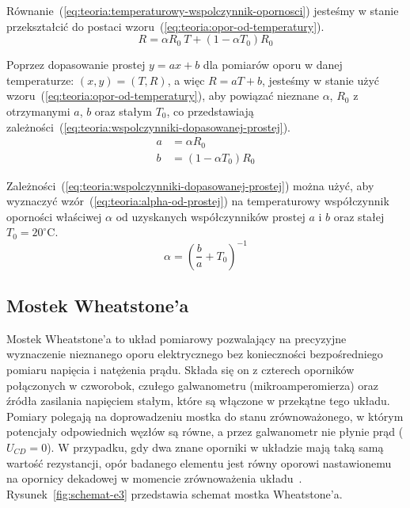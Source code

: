 \documentclass[twocolumn, a4paper, polish, 10pt]{article}
\begin{document}
Równanie~(\ref{eq:teoria:temperaturowy-wspolczynnik-opornosci}) jesteśmy w stanie przekształcić do postaci wzoru~(\ref{eq:teoria:opor-od-temperatury}).
\begin{equation}
    R = \alpha R_0~T + \left(1 - \alpha T_0 \right) R_0
    \label{eq:teoria:opor-od-temperatury}
\end{equation}

Poprzez dopasowanie prostej $y=ax+b$ dla pomiarów oporu w danej temperaturze: ${(x, y) = (T, R)}$, a więc $R = aT + b$, jesteśmy w stanie użyć wzoru~(\ref{eq:teoria:opor-od-temperatury}), aby powiązać nieznane $\alpha$, $R_0$ z otrzymanymi $a$, $b$ oraz stałym $T_0$, co przedstawiają zależności~(\ref{eq:teoria:wspolczynniki-dopasowanej-prostej}).
\begin{equation}
\begin{split}
    a &= \alpha R_0 \\
    b &= \left(1 - \alpha T_0 \right) R_0
    \label{eq:teoria:wspolczynniki-dopasowanej-prostej}
\end{split}
\end{equation}

Zależności~(\ref{eq:teoria:wspolczynniki-dopasowanej-prostej}) można użyć, aby wyznaczyć wzór~(\ref{eq:teoria:alpha-od-prostej}) na temperaturowy współczynnik oporności właściwej $\alpha$ od uzyskanych współczynników prostej $a$ i $b$ oraz stałej $T_0 = 20^{\circ}\mathrm{C}$.
\begin{equation}
    \alpha = \left( \frac{b}{a} + T_0 \right)^{-1}
    \label{eq:teoria:alpha-od-prostej}
\end{equation}

\subsection{Mostek Wheatstone'a}
Mostek Wheatstone'a to układ pomiarowy pozwalający na precyzyjne wyznaczenie nieznanego oporu elektrycznego bez konieczności bezpośredniego pomiaru napięcia i natężenia prądu. Składa się on z czterech oporników połączonych w czworobok, czułego galwanometru (mikroamperomierza) oraz źródła zasilania napięciem stałym, które są włączone w przekątne tego układu. Pomiary polegają na doprowadzeniu mostka do stanu zrównoważonego, w którym potencjały odpowiednich węzłów są równe, a przez galwanometr nie płynie prąd ($U_{CD}=0$). W przypadku, gdy dwa znane oporniki w układzie mają taką samą wartość rezystancji, opór badanego elementu jest równy oporowi nastawionemu na opornicy dekadowej w momencie zrównoważenia układu~\cite{pracownia-fizyczna-e3}. Rysunek~\ref{fig:schemat-e3} przedstawia schemat mostka Wheatstone'a.
\end{document}
